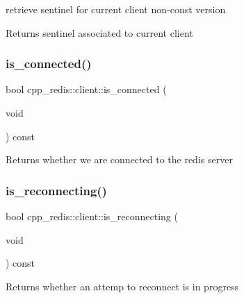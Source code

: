retrieve sentinel for current client non-\/const version

\begin{DoxyReturn}{Returns}
sentinel associated to current client 
\end{DoxyReturn}
\mbox{\label{classcpp__redis_1_1client_ad3608dec2c2bfabf2c621ce14f4db37a}} 
\subsubsection{\texorpdfstring{is\+\_\+connected()}{is\_connected()}}
{\footnotesize\ttfamily bool cpp\+\_\+redis\+::client\+::is\+\_\+connected (\begin{DoxyParamCaption}\item[{void}]{ }\end{DoxyParamCaption}) const}

\begin{DoxyReturn}{Returns}
whether we are connected to the redis server 
\end{DoxyReturn}
\mbox{\label{classcpp__redis_1_1client_af03ca1aec6416ab35e6aea93c74d89d1}} 
\subsubsection{\texorpdfstring{is\+\_\+reconnecting()}{is\_reconnecting()}}
{\footnotesize\ttfamily bool cpp\+\_\+redis\+::client\+::is\+\_\+reconnecting (\begin{DoxyParamCaption}\item[{void}]{ }\end{DoxyParamCaption}) const}

\begin{DoxyReturn}{Returns}
whether an attemp to reconnect is in progress 
\end{DoxyReturn}
\mbox{\label{classcpp__redis_1_1client_a490ef812b666e6d845fcacc808b87bc1}} 
